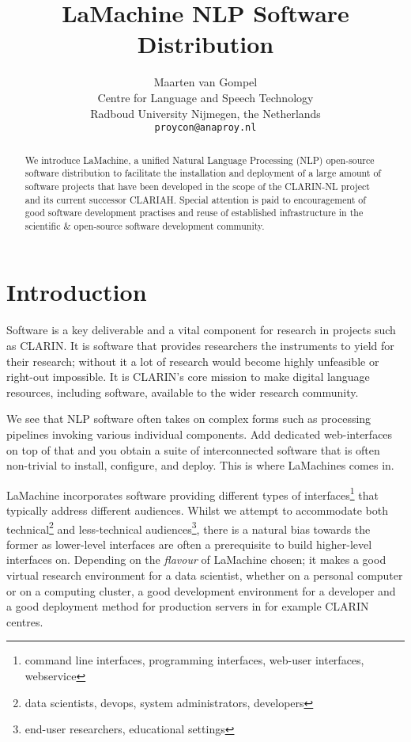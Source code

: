 \documentclass[a4paper,11pt]{article}
\title{LaMachine NLP Software Distribution}
\author{Maarten van Gompel \\
  Centre for Language and Speech Technology \\
  Radboud University Nijmegen, the Netherlands \\
  {\tt proycon@anaproy.nl} \\ %
}
\date{}
\begin{document}
\maketitle

\begin{abstract}
We introduce LaMachine, a unified Natural Language Processing (NLP) open-source software distribution to facilitate the
installation and deployment of a large amount of software projects that have been developed in the scope of the
CLARIN-NL project and its current successor CLARIAH. Special attention is paid to encouragement of good software
development practises and reuse of established infrastructure in the scientific \& open-source software development
community.
\end{abstract}

\section{Introduction} \label{intro}

Software is a key deliverable and a vital component for research in projects such as CLARIN. It is software that
provides researchers the instruments to yield for their research; without it a lot of research would become highly
unfeasible or right-out impossible. It is CLARIN's core mission to make digital language resources, including software,
available to the wider research community.

We see that NLP software often takes on complex forms such as processing pipelines invoking various individual
components. Add dedicated web-interfaces on top of that and you obtain a suite of interconnected software that is often
non-trivial to install, configure, and deploy. This is where LaMachines comes in.

LaMachine incorporates software providing different types of interfaces\footnote{command line interfaces, programming
interfaces, web-user interfaces, webservice} that typically address different audiences. Whilst we attempt to
accommodate both technical\footnote{data scientists, devops, system administrators, developers} and less-technical
audiences\footnote{end-user researchers, educational settings}, there is a natural bias towards the former as
lower-level interfaces are often a prerequisite to build higher-level interfaces on. Depending on the \emph{flavour} of
LaMachine chosen; it makes a good virtual research environment for a data scientist, whether on a personal computer or on a computing
cluster, a good development environment for a developer and a good deployment method for production servers in for
example CLARIN centres.
\end{document}
